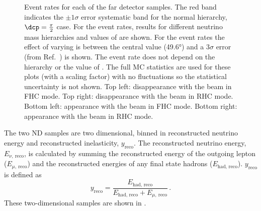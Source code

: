 \begin{figure}
	\begin{minipage}[t]{.5\linewidth}
		\begin{adjustbox}{max totalsize=\linewidth, center}
			
		\end{adjustbox} \\
		\begin{adjustbox}{max totalsize=\linewidth, center}
			
		\end{adjustbox}
	\end{minipage}
	\hfill
	\begin{minipage}[t]{.5\linewidth}
		\begin{adjustbox}{max totalsize=\linewidth, center}
			
		\end{adjustbox} \\
		\begin{adjustbox}{max totalsize=\linewidth, center}
			
		\end{adjustbox}
	\end{minipage}
	\caption[DUNE far detector event rates with systematic error bands.]{Event rates for each of the far detector samples. The red band indicates the $\pm1\sigma$ error systematic band for the normal hierarchy, $\dcp = \frac{\pi}{2}$ case. For the \nue event rates, results for different neutrino mass hierarchies and values of \dcp are shown. For the \numu event rates the effect of varying  is between the central value (\ang{49.6}) and a $3\sigma$ error (from Ref.~\cite{nufit4}) is shown. The \numu event rate does not depend on the hierarchy or the value of \dcp. The full MC statistics are used for these plots (with a scaling factor) with no fluctuations so the statistical uncertainty is not shown. Top left: \numu disappearance with the beam in FHC mode. Top right: \numu disappearance with the beam in RHC mode. Bottom left: \nue appearance with the beam in FHC mode. Bottom right: \nue appearance with the beam in RHC mode.}
	\label{fig:fdEventRatesWithErrorBand}
\end{figure}

The two ND samples are two dimensional, binned in reconstructed neutrino energy and reconstructed inelasticity, $y_{\text{reco}}$.
The reconstructed neutrino energy, $E_{\nu,~\text{reco}}$, is calculated by summing the reconstructed energy of the outgoing lepton ($E_{\mu,~\text{reco}}$) and the reconstructed energies of any final state hadrons ($E_{\text{had, reco}}$).
$y_{\text{reco}}$ is defined as
\begin{equation}
	y_{\text{reco}} = \frac{E_{\text{had, reco}}}{ E_{\text{had, reco}} + E_{\mu,~\text{reco}} } \, .
\end{equation}
These two-dimensional samples are shown in .

